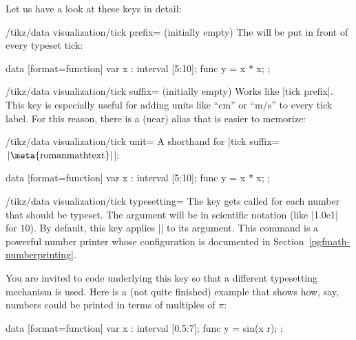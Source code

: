Let us have a look at these keys in detail:

\begin{key}{/tikz/data visualization/tick prefix= (initially \normalfont empty)}
    The  will be put in front of every typeset tick:
\begin{codeexample}[preamble={\usetikzlibrary{datavisualization.formats.functions}}]
\tikz \datavisualization
  [scientific axes, all axes={ticks=few, length=2.5cm},
   x axis={ticks={tick prefix=$\langle$, tick suffix=$]$}},
   visualize as line]
  data [format=function] {
    var x : interval [5:10];
    func y = \value x * \value x;
  };
\end{codeexample}
\end{key}

\begin{key}{/tikz/data visualization/tick suffix= (initially \normalfont empty)}
    Works like |tick prefix|. This key is especially useful for adding units
    like ``cm'' or ``$\mathrm m/\mathrm s$'' to every tick label. For this
    reason, there is a (near) alias that is easier to memorize:
    \begin{key}{/tikz/data visualization/tick unit=}
        A shorthand for |tick suffix={$\,\rm|\meta{roman math text}|$}|:
\begin{codeexample}[preamble={\usetikzlibrary{datavisualization.formats.functions}}]
\tikz \datavisualization
  [scientific axes, all axes={length=3cm},
   x axis={ticks={tick unit=s}},
   y axis={ticks={tick unit=m/s^2}},
   visualize as line]
  data [format=function] {
    var x : interval [5:10];
    func y = \value x * \value x;
  };
\end{codeexample}
    \end{key}
\end{key}

\begin{key}{/tikz/data visualization/tick typesetting=}
    The key gets called for each number that should be typeset. The argument
     will be in scientific notation (like |1.0e1| for $10$). By
    default, this key applies |\pgfmathprintnumber| to its argument. This
    command is a powerful number printer whose configuration is documented in
    Section~\ref{pgfmath-numberprinting}.

    You are invited to code underlying this key so that a different typesetting
    mechanism is used. Here is a (not quite finished) example that shows how,
    say, numbers could be printed in terms of multiples of $\pi$:
\begin{codeexample}[preamble={\usetikzlibrary{datavisualization.formats.functions}}]
\def\mytypesetter#1{%
  \pgfmathparse{#1/pi}%
  \pgfmathprintnumber{\pgfmathresult}$\pi$%
}
\tikz \datavisualization
  [school book axes, all axes={unit length=1.25cm},
   x axis={ticks={step=(0.5*pi), tick typesetter/.code=\mytypesetter{##1}}},
   y axis={include value={-1,1}},
   visualize as smooth line]
  data [format=function] {
    var x : interval [0.5:7];
    func y = sin(\value x r);
  };
\end{codeexample}
\end{key}


